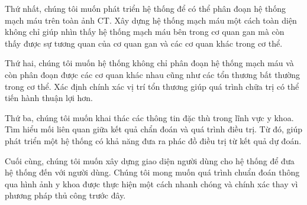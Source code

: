 	Thứ nhất, chúng tôi muốn phát triển hệ thống để có thể phân đoạn hệ thống mạch máu trên toàn ảnh CT. Xây dựng hệ thống mạch máu một cách toàn diện không chỉ giúp nhìn thấy hệ thống mạch máu bên trong cơ quan gan mà còn thấy được sự tương quan của cơ quan gan và các cơ quan khác trong cơ thể.
	
	Thứ hai, chúng tôi muốn hệ thống không chỉ phân đoạn hệ thống mạch máu và còn phân đoạn được các cơ quan khác nhau cũng như các tổn thương bất thường trong cơ thể. Xác định chính xác vị trí tổn thương giúp quá trình chữa trị có thể tiến hành thuận lợi hơn.
	
	Thứ ba, chúng tôi muốn khai thác các thông tin đặc thù trong lĩnh vực y khoa. Tìm hiểu mối liên quan giữa kết quả chẩn đoán và quá trình điều trị. Từ đó, giúp phát triển một hệ thống có khả năng đưa ra phác đồ điều trị từ kết quả dự đoán.
	
	Cuối cùng, chúng tôi muốn xây dựng giao diện người dùng cho hệ thống để đưa hệ thống đến với người dùng. Chúng tôi mong muốn quá trình chuẩn đoán thông qua hình ảnh y khoa được thực hiện một cách nhanh chóng và chính xác thay vì phương pháp thủ công trước đây.